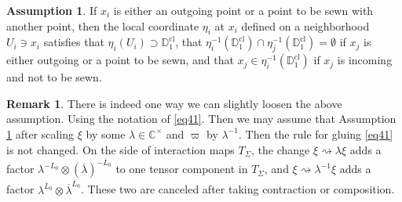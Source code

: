 \documentclass[11pt,b5paper,notitlepage]{article}
\theoremstyle{definition}
\newtheorem{rem}[df]{Remark}
\newtheorem{ass}[df]{Assumption}
\theoremstyle{plain}
\newcommand{\ovl}{\overline}
\newcommand{\Cbb}{\mathbb C}
\newcommand{\Dbb}{\mathbb D}
\newcommand{\cl}{\mathrm{cl}}
\numberwithin{equation}{section}
\begin{document}
\begin{ass}\label{lb32}
If $x_i$ is either an outgoing point or a point to be sewn with another point, then the local coordinate $\eta_i$ at $x_i$ defined on a neighborhood $U_i\ni x_i$ satisfies that $\eta_i(U_i)\supset\Dbb_1^\cl$, that $\eta_i^{-1}(\Dbb_1^\cl)\cap \eta_j^{-1}(\Dbb_1^\cl)=\emptyset$ if $x_j$ is either outgoing or a point to be sewn, and that $x_j\in\eta_i^{-1}(\Dbb_1^\cl)$ if $x_j$ is incoming and not to be sewn.
\end{ass}








\begin{rem}\label{lb34}
There is indeed one way we can slightly loosen the above assumption. Using the notation of \eqref{eq41}. Then we may assume that Assumption \ref{lb32} after scaling $\xi$ by some $\lambda\in\Cbb^\times$ and $\varpi$ by $\lambda^{-1}$. Then the rule for gluing \eqref{eq41} is not changed. On the side of interaction maps $T_{\Sigma}$, the change $\xi\rightsquigarrow \lambda \xi$ adds a factor $\lambda^{-L_0}\otimes(\ovl\lambda)^{-\ovl L_0}$ to one tensor component in $T_\Sigma$, and  $\xi\rightsquigarrow \lambda^{-1} \xi$ adds a factor $\lambda^{L_0}\otimes\ovl\lambda^{\ovl L_0}$. These two are canceled after taking contraction or composition.
\end{rem}


\subsection{}
\end{document}
